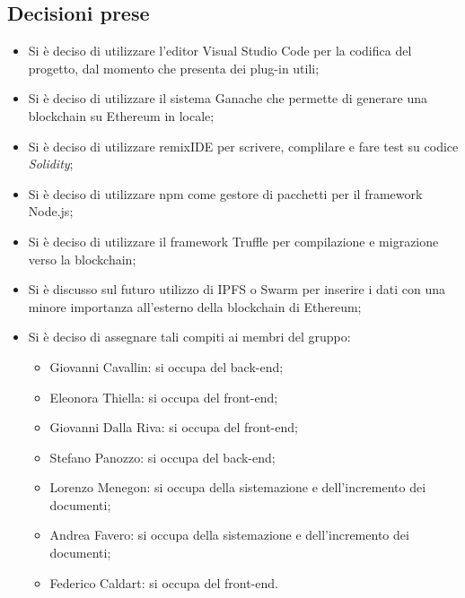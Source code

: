 	\subsection{Decisioni prese}
		\begin{itemize}
			\item Si è deciso di utilizzare l'editor Visual Studio Code per la codifica del progetto, dal momento che presenta dei plug-in utili;
			\item Si è deciso di utilizzare il sistema Ganache che permette di generare una blockchain su Ethereum in locale;
			\item Si è deciso di utilizzare remixIDE per scrivere, complilare e fare test su codice \emph{Solidity};
			\item Si è deciso di utilizzare npm come gestore di pacchetti per il framework Node.js;
			\item Si è deciso di utilizzare il framework Truffle per compilazione e migrazione verso la blockchain;
			\item Si è discusso sul futuro utilizzo di IPFS o Swarm per inserire i dati con una minore importanza all'esterno della blockchain di Ethereum;
			\item Si è deciso di assegnare tali compiti ai membri del gruppo:
				\begin{itemize}
					\item Giovanni Cavallin: si occupa del back-end;
					\item Eleonora Thiella: si occupa del front-end;
					\item Giovanni Dalla Riva: si occupa del front-end;
					\item Stefano Panozzo: si occupa del back-end;
					\item Lorenzo Menegon: si occupa della sistemazione e dell'incremento dei documenti;
					\item Andrea Favero: si occupa della sistemazione e dell'incremento dei documenti;
					\item Federico Caldart: si occupa del front-end.
				\end{itemize}
		\end{itemize}

